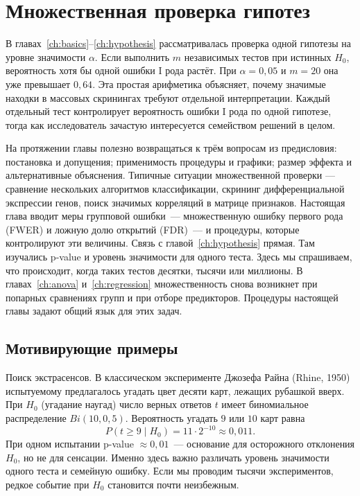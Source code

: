 \chapter{Множественная проверка гипотез}
\label{ch:multiple}

В главах~\ref{ch:basics}--\ref{ch:hypothesis} рассматривалась проверка одной гипотезы на уровне значимости $\alpha$.
Если выполнить $m$ независимых тестов при истинных $H_0$, вероятность хотя бы одной ошибки I рода растёт. При $\alpha=0{,}05$ и $m=20$ она уже превышает $0{,}64$.
Эта простая арифметика объясняет, почему значимые находки в массовых скринингах требуют отдельной интерпретации. Каждый отдельный тест контролирует вероятность ошибки I рода по одной гипотезе, тогда как исследователь зачастую интересуется семейством решений в целом.


На протяжении главы полезно возвращаться к трём вопросам из предисловия: постановка и допущения; применимость процедуры и графики; размер эффекта и альтернативные объяснения. 
Типичные ситуации множественной проверки --- сравнение нескольких алгоритмов классификации, скрининг дифференциальной экспрессии генов, поиск значимых корреляций в матрице признаков.
Настоящая глава вводит меры групповой ошибки~--- множественную ошибку первого рода (FWER) и ложную долю открытий (FDR)~--- и процедуры, которые контролируют эти величины.
Связь с главой~\ref{ch:hypothesis} прямая. Там изучались p-value и уровень значимости для одного теста. Здесь мы спрашиваем, что происходит, когда таких тестов десятки, тысячи или миллионы.
В главах~\ref{ch:anova} и~\ref{ch:regression} множественность снова возникнет при попарных сравнениях групп и при отборе предикторов. Процедуры настоящей главы задают общий язык для этих задач.

\section{Мотивирующие примеры}

Поиск экстрасенсов. В классическом эксперименте Джозефа Райна (Rhine, 1950) испытуемому предлагалось угадать цвет десяти карт, лежащих рубашкой вверх.
При $H_0$ (угадание наугад) число верных ответов $t$ имеет биномиальное распределение $Bi(10, 0{,}5)$.
Вероятность угадать $9$ или $10$ карт равна
\[ P(t\geq 9\mid H_0)=11\cdot 2^{-10}\approx 0{,}011.
\]
При одном испытании p-value $\approx 0{,}01$~--- основание для осторожного отклонения $H_0$, но не для сенсации.
Именно здесь важно различать уровень значимости одного теста и семейную ошибку. Если мы проводим тысячи экспериментов, редкое событие при $H_0$ становится почти неизбежным.

